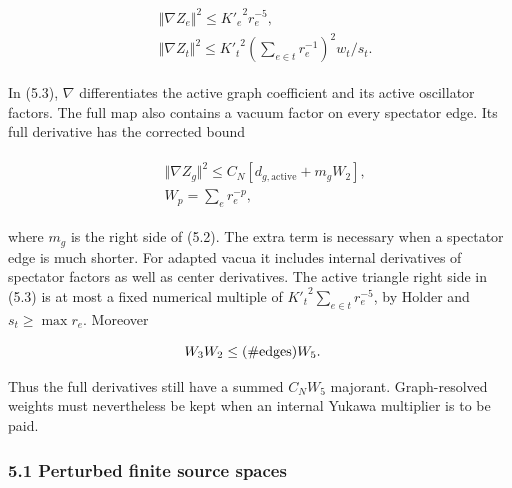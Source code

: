 \begin{gather*}
\begin{aligned}
& \Vert \nabla  Z_{e}\Vert ^{2} \le  {K'_{e}}^{2} r_{e}^{-5}, \\
& \Vert \nabla  Z_{t}\Vert ^{2} \le  {K'_{t}}^{2} (\sum _{e \in  t} r_{e}^{-1})^{2} w_{t}/s_{t}.
\end{aligned}\tag{5.3}
\end{gather*}

In (5.3), \(\nabla\) differentiates the active graph coefficient and its
active oscillator factors. The full map also contains a vacuum factor on
every spectator edge. Its full derivative has the corrected bound

\begin{gather*}
\begin{aligned}
& \Vert \nabla  Z_{g}\Vert ^{2} \le  C_{N}[d_{g,\mathrm{active}}+m_{g} W_{2}], \\
& W_{p}=\sum _{e} r_{e}^{-p},
\end{aligned}\tag{5.4}
\end{gather*}

where \(m_{g}\) is the right side of (5.2). The extra term is necessary
when a spectator edge is much shorter. For adapted vacua it includes
internal derivatives of spectator factors as well as center derivatives.
The active triangle right side in (5.3) is at most a fixed numerical
multiple of \({K'_{t}}^{2} \sum _{e \in  t} r_{e}^{-5}\), by Holder and
\(s_{t}\ge \max  r_{e}\). Moreover

\begin{gather*}
\begin{aligned}
& W_{3} W_{2} \le  (\#\text{edges}) W_{5}.
\end{aligned}\notag
\end{gather*}

Thus the full derivatives still have a summed \(C_{N} W_{5}\) majorant.
Graph-resolved weights must nevertheless be kept when an internal Yukawa
multiplier is to be paid.

\subsubsection{5.1 Perturbed finite source
spaces}\label{c-perturbed-finite-source-spaces}

